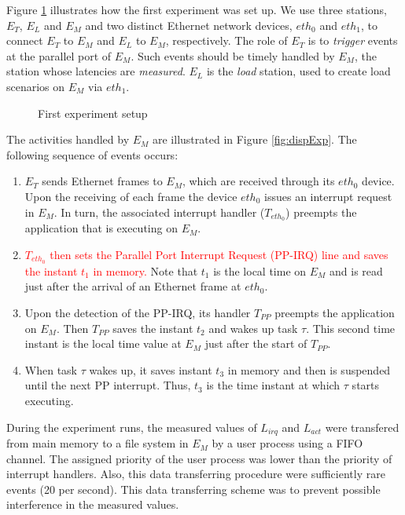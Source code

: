 \documentclass{acm_proc_article-sp}
\newcommand{\col}[1]{\textcolor{red}{#1}}
\begin{document}
Figure \ref{fig:config} illustrates how the first experiment was set up. We use 
three stations, $E_T$, $E_L$ and $E_M$ and two distinct Ethernet
network devices, $eth_0$ and $eth_1$, to connect $E_T$ to $E_M$ and $E_L$
to $E_M$, respectively. The role of $E_T$ is to \emph{trigger} events at the
parallel port of $E_M$. Such events should be timely handled by $E_M$, the station
whose latencies are \emph{measured}.  $E_L$ is the \emph{load} station, used to
create load scenarios on $E_M$ via $eth_1$.

\begin{figure}[tbh]
  \centering {\scalebox{1}{}}
  \caption{First experiment setup}
  \label{fig:config}
\end{figure}

The activities handled by $E_M$ are illustrated in Figure \ref{fig:dispExp}. The
following sequence of events occurs:

\begin{enumerate}
\item $E_T$ sends Ethernet frames to $E_M$, which are received through its $eth_0$
  device. Upon the receiving of each frame the device $eth_0$ issues an interrupt
  request in $E_M$. In turn, the associated interrupt handler ($T_{eth_0}$) preempts
  the application that is executing on $E_M$.

\item \col{$T_{eth_0}$ then sets the Parallel Port Interrupt Request (PP-IRQ) line and
    saves the instant $t_1$ in memory.} Note that $t_1$ is the local time on $E_M$
  and is read just after the arrival of an Ethernet frame at $eth_0$.

\item Upon the detection of the PP-IRQ, its handler $T_{PP}$ preempts the
  application on $E_M$.  Then $T_{PP}$ saves the instant $t_2$ and wakes up task
  $\tau$. This second time instant is the local time value at $E_M$ just after the
  start of $T_{PP}$.
  
\item When task $\tau$ wakes up, it saves instant $t_3$ in memory and then is
  suspended until the next PP interrupt. Thus, $t_3$ is the time instant at which
  $\tau$ starts executing.
\end{enumerate}

During the experiment runs, the measured values of $L_{irq}$ and $L_{act}$ were
transfered from main memory to a file system in $E_M$ by a user process using a FIFO
channel. The assigned priority of the user process was lower than the priority of
interrupt handlers.  Also, this data transferring procedure were sufficiently rare
events (20 per second). This data transferring scheme was to prevent possible
interference in the measured values.
\end{document}
